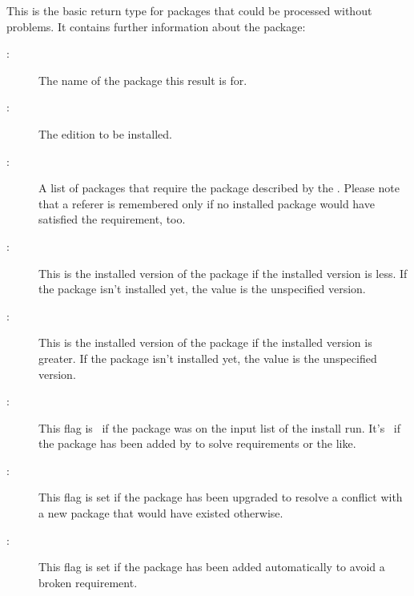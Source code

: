\documentclass[10pt]{article}
\begin{document}
This is the basic return type for packages that could be processed
without problems. It contains further information about the package:
\begin{description}
\item[:]
  The name of the package this result is for.

\item[:]
  The edition to be installed.

\item[:]
  A list of packages that require the package described by the
  . Please note that a referer is remembered only if no
  installed package would have satisfied the requirement, too.

\item[:]
  This is the installed version of the package if the installed
  version is less. If the package isn't installed yet, the value is
  the unspecified version.

\item[:]
  This is the installed version of the package if the installed
  version is greater. If the package isn't installed yet, the value is
  the unspecified version.

\item[:]
  This flag is \true\ if the package was on the input list of the
  install run. It's \false\ if the package has been added by
   to solve requirements or the like.

\item[:]
  This flag is set if the package has been upgraded to resolve a
  conflict with a new package that would have existed otherwise.

\item[:]
  This flag is set if the package has been added automatically to
  avoid a broken requirement.
\end{description}
\end{document}
